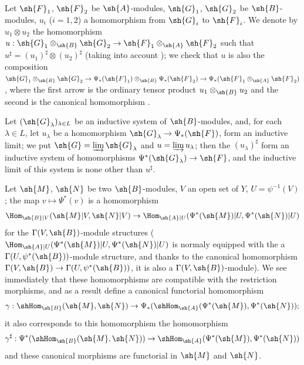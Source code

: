 \begin{env}[4.4.4]
\label{0.4.4.4}
Let $\sh{F}_1$, $\sh{F}_2$ be $\sh{A}$-modules, $\sh{G}_1$, $\sh{G}_2$ be $\sh{B}$-modules,
$u_i$ ($i=1,2$) a homomorphism from $\sh{G}_i$ to $\sh{F}_i$. We denote by $u_1\otimes u_2$
the homomorphism $u:\sh{G}_1\otimes_\sh{B}\sh{G}_2\to\sh{F}_1\otimes_\sh{A}\sh{F}_2$ such
that $u^\sharp=(u_1)^\sharp\otimes(u_2)^\sharp$ (taking into account ); we check
that $u$ is also the composition
$\sh{G}_1\otimes_\sh{B}\sh{G}_2\to\Psi_*(\sh{F}_1)\otimes_\sh{B}\Psi_*(\sh{F}_2)
\to\Psi_*(\sh{F}_1\otimes_\sh{A}\sh{F}_2)$, where the first arrow is the ordinary tensor
product $u_1\otimes_\sh{B}u_2$ and the second is the canonical homomorphism .
\end{env}

\begin{env}[4.4.5]
\label{0.4.4.5}
Let $(\sh{G}_\lambda)_{\lambda\in L}$ be an inductive system of
$\sh{B}$-modules, and, for each $\lambda\in L$, let $u_\lambda$ be a
homomorphism $\sh{G}_\lambda\to\Psi_*(\sh{F})$, form an inductive limit; we put
$\sh{G}=\varinjlim\sh{G}_\lambda$ and $u=\varinjlim u_\lambda$; then the
$(u_\lambda)^\sharp$ form an inductive system of homomorphisms
$\Psi^*(\sh{G}_\lambda)\to\sh{F}$, and the inductive limit of this system is
none other than $u^\sharp$.
\end{env}

\begin{env}[4.4.6]
\label{0.4.4.6}
Let $\sh{M}$, $\sh{N}$ be two $\sh{B}$-modules, $V$ an open set of $Y$,
$U=\psi^{-1}(V)$; the map $v\mapsto\Psi^*(v)$ is a homomorphism
\[
  \Hom_{\sh{B}|V}(\sh{M}|V,\sh{N}|V)
  \to\Hom_{\sh{A}|U}(\Psi^*(\sh{M})|U,\Psi^*(\sh{N})|U)
\]
for the $\Gamma(V,\sh{B})$-module structures
($\Hom_{\sh{A}|U}(\Psi^*(\sh{M})|U,\Psi^*(\sh{N})|U)$ is normaly equipped with the a
$\Gamma(U,\psi^*(\sh{B}))$-module structure, and thanks to the canonical homomorphism
 $\Gamma(V,\sh{B})\to\Gamma(U,\psi^*(\sh{B}))$, it is also a
$\Gamma(V,\sh{B})$-module). We see immediately that these homomorphisms are compatible with
the restriction morphisms, and as a result define a canonical functorial homomorphism
\[
  \gamma:\shHom_\sh{B}(\sh{M},\sh{N})
  \to\Psi_*(\shHom_\sh{A}(\Psi^*(\sh{M}),\Psi^*(\sh{N}));
\]
it also corresponds to this homomorphism the homomorphism
\[
  \gamma^\sharp:\Psi^*(\shHom_\sh{B}(\sh{M},\sh{N}))
  \to\shHom_\sh{A}(\Psi^*(\sh{M}),\Psi^*(\sh{N}))
\]
and these canonical morphisms are functorial in $\sh{M}$ and $\sh{N}$.
\end{env}

